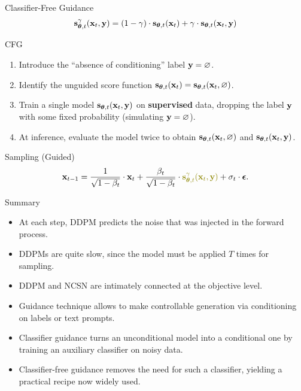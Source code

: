 \documentclass{beamer}
\renewcommand{\eqpause}{}
\begin{document}
\begin{frame}{Classifier-Free Guidance}
	\[
		\mathbf{s}^{\gamma}_{\boldsymbol{\theta}, t}(\mathbf{x}_t, \mathbf{y}) = (1 - \gamma) \cdot \mathbf{s}_{\boldsymbol{\theta}, t}(\mathbf{x}_t) +  \gamma \cdot \mathbf{s}_{\boldsymbol{\theta}, t}(\mathbf{x}_t, \mathbf{y})
	\]
	\vspace{-0.5cm}
	\begin{block}{CFG}
		\begin{enumerate}
			\item Introduce the ``absence of conditioning'' label $\mathbf{y} = \varnothing$.
			\item Identify the unguided score function $\mathbf{s}_{\boldsymbol{\theta}, t}(\mathbf{x}_t) = \mathbf{s}_{\boldsymbol{\theta}, t}(\mathbf{x}_t, \varnothing)$.
			\item Train a single model $\mathbf{s}_{\boldsymbol{\theta}, t}(\mathbf{x}_t, \mathbf{y})$ on \textbf{supervised} data, dropping the label $\mathbf{y}$ with some fixed probability (simulating $\mathbf{y} = \varnothing$).
			\item At inference, evaluate the model twice to obtain $\mathbf{s}_{\boldsymbol{\theta}, t}(\mathbf{x}_t, \varnothing)$ and $\mathbf{s}_{\boldsymbol{\theta}, t}(\mathbf{x}_t, \mathbf{y})$.
		\end{enumerate}
	\end{block}
	\vspace{-0.3cm}
	\eqpause
	\begin{block}{Sampling (Guided)}
		\vspace{-0.3cm}
		\[
			\bx_{t-1} = \frac{1}{\sqrt{1 - \beta_t}} \cdot \bx_t + \frac{\beta_t}{\sqrt{1 - \beta_t}} \cdot  {\color{olive}\bs^{\gamma}_{\btheta, t}(\bx_t, \by)} + \sigma_t \cdot \bepsilon.
		\]
		\vspace{-0.3cm}
	\end{block}
\end{frame}
\begin{frame}{Summary}
    \begin{itemize}
        \item At each step, DDPM predicts the noise that was injected in the forward process. 
        \vfill
        \item DDPMs are quite slow, since the model must be applied $T$ times for sampling.	
		\vfill
		\item DDPM and NCSN are intimately connected at the objective level.
		\vfill
		\item Guidance technique allows to make controllable generation via conditioning on labels or text prompts.
        \vfill 
		\item Classifier guidance turns an unconditional model into a conditional one by training an auxiliary classifier on noisy data.
		\vfill
		\item Classifier-free guidance removes the need for such a classifier, yielding a practical recipe now widely used.
    \end{itemize}
\end{frame}
\end{document}
